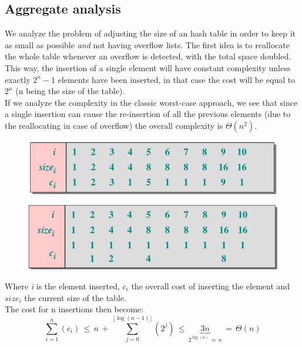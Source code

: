\documentclass{article}
\begin{document}
		\subsection{Aggregate analysis}
			We analyze the problem of adjusting the size of an hash table in order to keep it as small as possible \textit{and} not having overflow lists. The first idea is to reallocate the whole table whenever an overflow is detected, with the total space doubled. This way, the insertion of a single element will have constant complexity unless exactly $2^n-1$ elements have been inserted, in that case the cost will be equal to $2^n$ (n being the size of the table).\\
			If we analyze the complexity in the classic worst-case approach, we see that since a single insertion can cause the re-insertion of all the previous elements (due to the reallocating in case of overflow) the overall complexity is $\Theta(n^2)$.
			\begin{figure}[H]
				\centering
				\includegraphics[width = \textwidth]{images/amortized1.png}
			\end{figure}
			\begin{figure}[H]
				\centering
				\includegraphics[width = \textwidth]{images/amortized2.png}
			\end{figure}
			Where \emph{i} is the element inserted, $c_i$ the overall cost of inserting the element and $size_i$ the current size of the table.\\
			The cost for n insertions then become:
			\begin{equation}
				\sum_{i=1}^{n}(c_i)\, \leq\, n\, +\, \sum_{j=0}^{\lfloor \log(n-1) \rfloor}(2^j)\, \leq\, \underbrace{3n}_{2^{\log(n)}\, \approx\, n}\, =\, \Theta(n)
			\end{equation}
\end{document}
